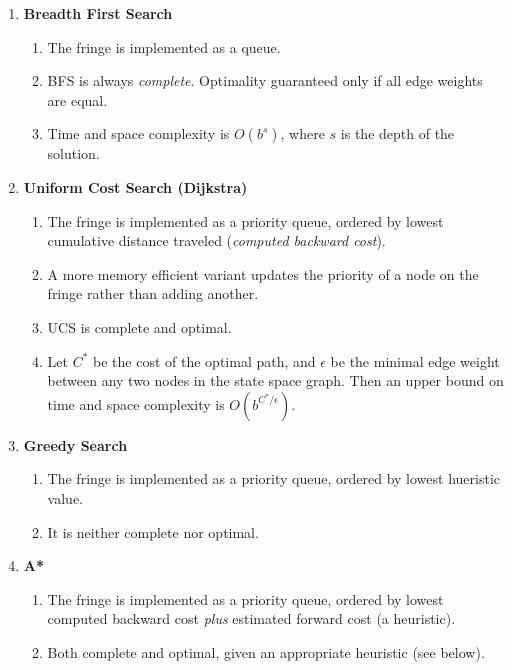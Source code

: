\documentclass[10pt]{article}
\begin{document}
\begin{multicols}{2}
\begin{addmargin}[0.8em]{0.5em}
\begin{enumerate}[label=(\alph*)]
         \item \textbf{Breadth First Search}
         \begin{enumerate}[label=\roman*.]
             \item The fringe is implemented as a queue. 
             \item BFS is always \textit{complete}. Optimality guaranteed only if all edge weights are equal. 
             \item Time and space complexity is $O(b^s)$, where $s$ is the depth of the solution.
         \end{enumerate}
         
         \item \textbf{Uniform Cost Search (Dijkstra)}
         \begin{enumerate}[label=\roman*.]
             \item The fringe is implemented as a priority queue, ordered by lowest cumulative distance traveled (\textit{computed backward cost}). 
             \item A more memory efficient variant updates the priority of a node on the fringe rather than adding another.
             \item UCS is complete and optimal.
             \item Let $C^*$ be the cost of the optimal path, and $\epsilon$ be the minimal edge weight between any two nodes in the state space graph. Then an upper bound on time and space complexity is $O(b^{C^* / \epsilon})$.
         \end{enumerate}
         
         \item \textbf{Greedy Search}
         \begin{enumerate}[label=\roman*.]
             \item The fringe is implemented as a priority queue, ordered by lowest hueristic value.
             \item It is neither complete nor optimal.
         \end{enumerate}
         
         \item \textbf{A*}
         \begin{enumerate}[label=\roman*.]
             \item The fringe is implemented as a priority queue, ordered by lowest computed backward cost \textit{plus} estimated forward cost (a heuristic).
             \item Both complete and optimal, given an appropriate heuristic (see below).
         \end{enumerate}
         

\end{enumerate}
\end{addmargin}
\end{multicols}
\end{document}
